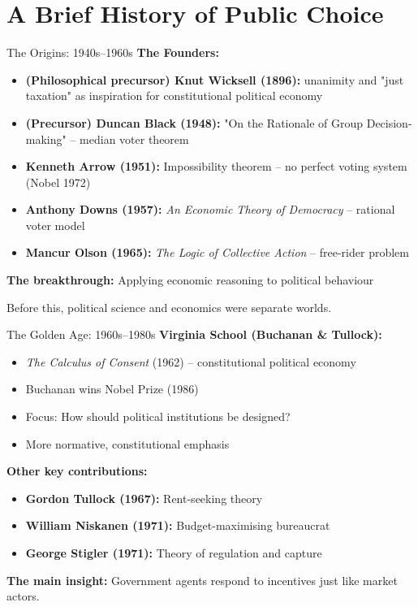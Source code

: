 \documentclass[10pt]{beamer}
\begin{document}
\section{A Brief History of Public Choice}

\begin{frame}{The Origins: 1940s--1960s}
\textbf{The Founders:}
\begin{itemize}
\item \textbf{(Philosophical precursor) Knut Wicksell (1896):} unanimity and "just taxation" as inspiration for constitutional political economy
\item \textbf{(Precursor) Duncan Black (1948):} "On the Rationale of Group Decision-making" -- median voter theorem
\item \textbf{Kenneth Arrow (1951):} Impossibility theorem -- no perfect voting system (Nobel 1972)
\item \textbf{Anthony Downs (1957):} \textit{An Economic Theory of Democracy} -- rational voter model
\item \textbf{Mancur Olson (1965):} \textit{The Logic of Collective Action} -- free-rider problem
\end{itemize}


\textbf{The breakthrough:} Applying economic reasoning to political behaviour


\small{Before this, political science and economics were separate worlds.}
\end{frame}

\begin{frame}{The Golden Age: 1960s--1980s}
\textbf{Virginia School (Buchanan \& Tullock):}
\begin{itemize}
\item \textit{The Calculus of Consent} (1962) -- constitutional political economy
\item Buchanan wins Nobel Prize (1986)
\item Focus: How should political institutions be designed?
\item More normative, constitutional emphasis
\end{itemize}


\textbf{Other key contributions:}
\begin{itemize}
\item \textbf{Gordon Tullock (1967):} Rent-seeking theory
\item \textbf{William Niskanen (1971):} Budget-maximising bureaucrat
\item \textbf{George Stigler (1971):} Theory of regulation and capture
\end{itemize}


\textbf{The main insight:} Government agents respond to incentives just like market actors.
\end{frame}
\end{document}
